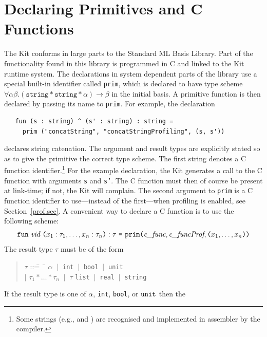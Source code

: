 \documentclass[12pt]{book}
\begin{document}
\section{Declaring Primitives and C Functions}
\label{parPassing.sec}
The Kit conforms in large parts to the Standard ML Basis Library. Part
of the functionality found in this library is programmed in C and
linked to the Kit runtime system.  The declarations in system
dependent parts of the library use a special built-in identifier
called \texttt{prim}, which is declared to have type
scheme $\forall \alpha \beta .  (\texttt{string} \ast \texttt{string}
\ast \alpha) \rightarrow \beta$ in the initial basis.  A primitive
function is then declared by passing its name to \texttt{prim}.  For
example, the declaration
\begin{verbatim}
   fun (s : string) ^ (s' : string) : string = 
     prim ("concatString", "concatStringProfiling", (s, s'))
\end{verbatim}
declares string catenation.  The argument and result types are
explicitly stated so as to give the primitive the correct type scheme.
The first string  denotes a C
function identifier.\footnote{Some strings (e.g.,  and ) are
  recognised and implemented in assembler by the compiler.} For the
example declaration, the Kit generates a call to the C function  with arguments {\tt s} and {\tt s'}. The C
function must then of course be present at link-time; if not, the Kit will complain. The second
argument to {\tt prim} is a C function identifier to use---instead of the first---when profiling is
enabled, see Section~\ref{prof.sec}. A convenient way to declare a C function is to use the
following scheme:
$$\texttt{fun}~ \emph{vid} ~\texttt{(}x_1:\tau_1, \ldots, x_n:\tau_n\texttt{)}
    : \tau ~\texttt{=} ~\texttt{prim(}\emph{c\_func}, \emph{c\_funcProf}, \texttt{(}
  x_1, \ldots, x_n\texttt{)} \texttt{)}
$$
The result type $\tau$ must be of the form
\begin{quote}
\begin{tabbing}
$\tau$ ::\== ~\= $\alpha$ $~|~$ {\tt int} $~|~$ {\tt bool} $~|~$ {\tt unit} \\ 
  \> $|$ \> $\tau_1 \ast \ldots \ast \tau_n$ $~|~$ $\tau$ {\tt list} $~|~$ {\tt real} $~|~$ {\tt string} 
\end{tabbing}
\end{quote}
\noindent
If the result type is one of $\alpha$, {\tt int}, {\tt bool}, or ${\tt unit}$ then the
\end{document}
